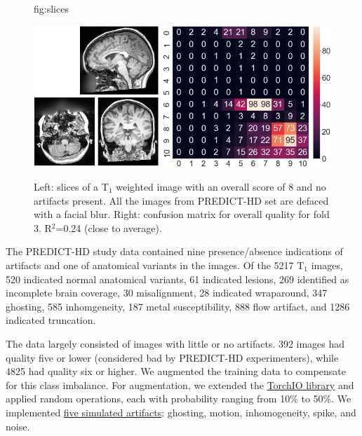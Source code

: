 \documentclass{midl} %
\begin{document}
\begin{figure}[btp] %
\floatconts
  {fig:slices} %
  {\caption{Left: slices of a T$_1$ weighted image with an overall score of 8 and no artifacts present. All the images from PREDICT-HD set are defaced with a facial blur. Right: confusion matrix for overall quality for fold 3. R$^2$=0.24 (close to average).}}
  {
  \includegraphics[width=0.75\linewidth]{figure.png}
  \vspace{-1.5\baselineskip} %
  }
\end{figure}

The PREDICT-HD study data contained nine presence/absence indications of artifacts and one of anatomical variants in the images.
Of the 5217 T$_1$ images, 520 indicated normal anatomical variants, 61 indicated lesions, 269 identified as incomplete brain coverage, 30 misalignment, 28 indicated wraparound, 347 ghosting, 585 inhomgeneity, 187 metal susceptibility, 888 flow artifact, and 1286 indicated truncation.

The data largely consisted of images with little or no artifacts. 392 images had quality five or lower (considered bad by PREDICT-HD experimenters), while 4825 had quality six or higher. We augmented the training data to compensate for this class imbalance. For augmentation, we extended the \href{https://torchio.readthedocs.io/transforms/augmentation.html}{TorchIO library} and applied random operations, each with probability ranging from 10\% to 50\%. We implemented \href{https://github.com/OpenImaging/miqa/pull/339}{five simulated artifacts}: ghosting, motion, inhomogeneity, spike, and noise.
\end{document}
